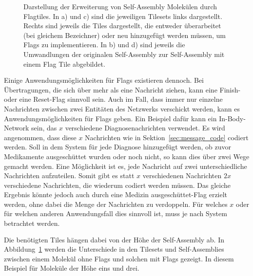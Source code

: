 \begin{figure}
    \caption[Flags Beispiel]{Darstellung der Erweiterung von Self-Assembly Molekülen durch Flagtiles. In a) und c) sind die jeweiligen Tilesets links dargestellt. Rechts sind jeweils die Tiles dargestellt, die entweder überarbeitet (bei gleichem Bezeichner) oder neu hinzugefügt werden müssen, um Flags zu implementieren. In b) und d) sind jeweils die Umwandlungen der originalen Self-Assembly zur Self-Assembly mit einem Flag Tile abgebildet.}
    \label{fig:flags}
\end{figure}

Einige Anwendungsmöglichkeiten für Flags existieren dennoch. Bei Übertragungen, die sich über mehr als eine Nachricht ziehen, kann eine Finish- oder eine Reset-Flag sinnvoll sein. Auch im Fall, dass immer nur einzelne Nachrichten zwischen zwei Entitäten des Netzwerks verschickt werden, kann es Anwendungsmöglichkeiten für Flags geben. Ein Beispiel dafür kann ein In-Body-Network sein, das $x$ verschiedene Diagnosenachrichten verwendet. Es wird angenommen, dass diese $x$ Nachrichten wie in Sektion~\ref{sec:message_code} codiert werden. Soll in dem System für jede Diagnose hinzugefügt werden, ob zuvor Medikamente ausgeschüttet wurden oder noch nicht, so kann dies über zwei Wege gemacht werden. Eine Möglichkeit ist es, jede Nachricht auf zwei unterschiedliche Nachrichten aufzuteilen. Somit gibt es statt $x$ verschiedenen Nachrichten $2x$ verschiedene Nachrichten, die wiederum codiert werden müssen. Das gleiche Ergebnis könnte jedoch auch durch eine \glqq Medizin ausgeschüttet\grqq-Flag erzielt werden, ohne dabei die Menge der Nachrichten zu verdoppeln. Für welches $x$ oder für welchen anderen Anwendungsfall dies sinnvoll ist, muss je nach System betrachtet werden. 

Die benötigten Tiles hängen dabei von der Höhe der Self-Assembly ab. In Abbildung~\ref{fig:flags} werden die Unterschiede in den Tilesets und Self-Assemblies zwischen einem Molekül ohne Flags und solchen mit Flags gezeigt. In diesem Beispiel für Moleküle der Höhe eins und drei.

